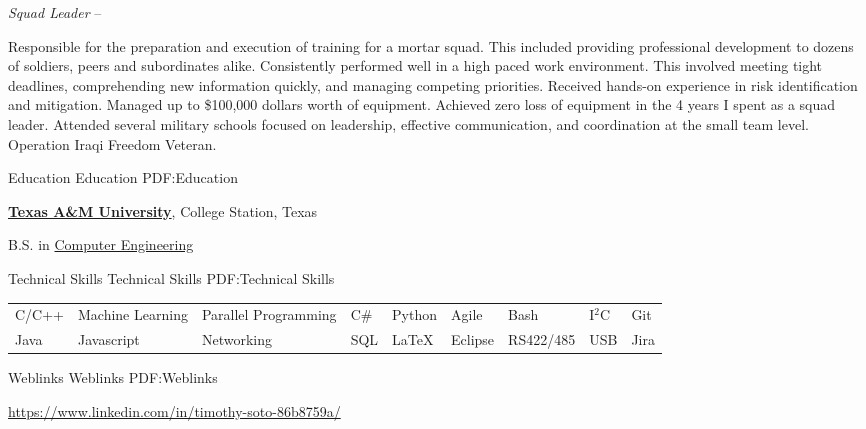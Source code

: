 \documentclass[letterpaper,MMMyyyy,nonstopmode]{simpleresumecv}
\begin{document}
\begin{Body}
        {\textit{Squad Leader}}
    \hfill
     --
    \begin{Detail}
        \BulletItem
        Responsible for the preparation and execution of training for a mortar squad. This included providing professional development to dozens of soldiers, peers and subordinates alike.
        \vspace{1mm} %
        \BulletItem
        Consistently performed well in a high paced work environment. This involved meeting tight deadlines, comprehending new information quickly, and managing competing priorities.
        \vspace{1mm} %
        \BulletItem
        Received hands-on experience in risk identification and mitigation.
        \vspace{1mm} %
        \BulletItem
        Managed up to \$100,000 dollars worth of equipment. Achieved zero loss of equipment in the 4 years I spent as a squad leader.
        \vspace{1mm} %
        \BulletItem
        Attended several military schools focused on leadership, effective communication, and coordination at the small team level.
        \vspace{1mm} %
        \BulletItem
        Operation Iraqi Freedom Veteran.
    \end{Detail}
    \BigGap

    \vspace{3mm} %
    \Section
    {Education}
    {Education}
    {PDF:Education}

    \Entry
    \href{http://www.tamu.edu}
    {\textbf{Texas A\&M University}},
    College Station, Texas

    B.S. in
    \href{http://www.example.com/my-department}
    {Computer Engineering}
    \hfill


    \Section
    {Technical Skills}
    {Technical Skills}
    {PDF:Technical Skills}

    \noindent\begin{tabular}[t]{@{}lllllllll}
        C/C++ & Machine Learning & Parallel Programming & C\# & Python   & Agile   & Bash      & I$^{2}$C & Git  \\
        Java  & Javascript       & Networking           & SQL & {\LaTeX} & Eclipse & RS422/485 & USB      & Jira
    \end{tabular}


    \Section
    {Weblinks}
    {Weblinks}
    {PDF:Weblinks}

    \href{https://www.linkedin.com/in/timothy-soto-86b8759a/}
    {https://www.linkedin.com/in/timothy-soto-86b8759a/}
\end{Body}
\end{document}

